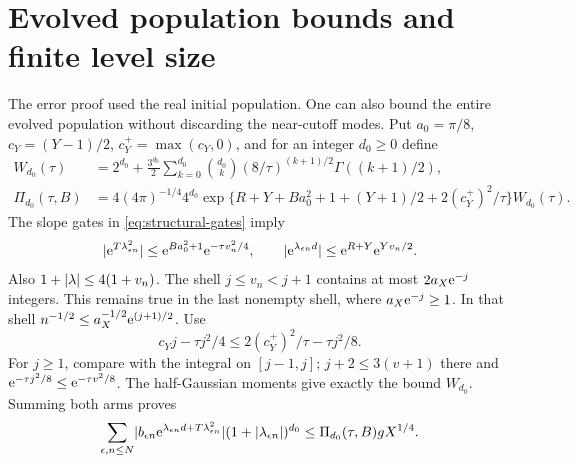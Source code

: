 \section{Evolved population bounds and finite level size}
\label{app:population}
The error proof used the real initial population. One can also
bound the entire evolved population without discarding the
near-cutoff modes. Put \(a_0=\pi/8\), \(c_Y=(Y-1)/2\),
\(c_Y^+=\max(c_Y,0)\), and for an integer \(d_0\ge0\) define
\begin{subequations}\label{eq:Pi}
\begin{align}
 W_{d_0}(\tau)
 &=2^{d_0}+\frac{3^{d_0}}2\sum_{k=0}^{d_0}\binom{d_0}{k}
              (8/\tau)^{(k+1)/2}\Gamma((k+1)/2),\\
 \Pi_{d_0}(\tau,B)
 &=4(4\pi)^{-1/4}4^{d_0}
   \exp\{R+Y+Ba_0^2+1+(Y+1)/2+2(c_Y^+)^2/\tau\}
                   W_{d_0}(\tau).
\end{align}
\end{subequations}
The slope gates in \eqref{eq:structural-gates} imply
\[
 \lvert \mathrm e^{T\lambda_{\epsilon n}^2}\rvert
       \le\mathrm e^{Ba_0^2+1}\mathrm e^{-\tau v_n^2/4},
 \qquad
 \lvert \mathrm e^{\lambda_{\epsilon n}d}\rvert
       \le\mathrm e^{R+Y}\mathrm e^{Yv_n/2}.
\]
Also \(1+\lvert \lambda\rvert\le4(1+v_n)\).
The shell \(j\le v_n<j+1\) contains at most \(2a_X\mathrm e^{-j}\)
integers. This remains true in the last nonempty shell,
where \(a_X\mathrm e^{-j}\ge1\).
In that shell \(n^{-1/2}\le a_X^{-1/2}\mathrm e^{(j+1)/2}\).
Use
\[
 c_Yj-\tau j^2/4
       \le2(c_Y^+)^2/\tau-\tau j^2/8.
\]
For \(j\ge1\), compare with the integral on \([j-1,j]\);
\(j+2\le3(v+1)\) there and
\(\mathrm e^{-\tau j^2/8}\le\mathrm e^{-\tau v^2/8}\).
The half-Gaussian moments give exactly the bound \(W_{d_0}\).
Summing both arms proves
\begin{equation}
 \sum_{\epsilon,n\le N}
 \lvert b_{\epsilon n}\mathrm e^{\lambda_{\epsilon n}d+T\lambda_{\epsilon n}^2}\rvert
       (1+\lvert \lambda_{\epsilon n}\rvert)^{d_0}
       \le \Pi_{d_0}(\tau,B)gX^{1/4}.
 \label{eq:evolved-population}
\end{equation}

